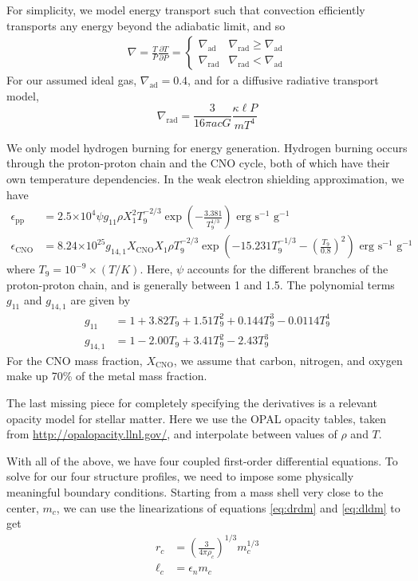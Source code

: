\documentclass[onecolumn]{article}
\newcommand{\E}[1]{\ensuremath{\times 10^{#1}}}
\newcommand{\D}[2]{\ensuremath{\frac{\partial #1}{\partial #2}}}
\begin{document}
For simplicity, we model energy transport such that convection efficiently transports any energy beyond the adiabatic limit, and so
\begin{align} \nabla = \frac{T}{P}\D{T}{P} = 
  \begin{cases}
    \nabla_\text{ad} & \nabla_\text{rad} \ge \nabla_\text{ad} \\
    \nabla_\text{rad} & \nabla_\text{rad} < \nabla_\text{ad}
  \end{cases}
\end{align}
For our assumed ideal gas, $\nabla_\text{ad} = 0.4$, and for a diffusive radiative transport model,
\begin{equation} 
  \nabla_\text{rad} = \frac{3}{16\pi a c G}\frac{\kappa \ell P}{m T^4} 
\end{equation}

We only model hydrogen burning for energy generation.  Hydrogen burning occurs through the proton-proton chain and the CNO cycle, both of which have their own temperature dependencies.  In the weak electron shielding approximation, we have
\begin{align}  
  \epsilon_\text{pp} &= 2.5\E{4} \psi g_\text{11} \rho X_1^2 T_9^{-2/3} \exp\left(-\frac{3.381}{T_9^{1/3}}\right) \text{ erg s}^{-1}\text{ g}^{-1} \\
  \epsilon_\text{CNO} &= 8.24\E{25} g_{14,1} X_\text{CNO} X_1 \rho T_9^{-2/3} \exp\left(-15.231 T_9^{-1/3} - \left(\frac{T_9}{0.8}\right)^2\right) \text{ erg s}^{-1}\text{ g}^{-1} \nonumber
\end{align}
where $T_9 = 10^{-9} \times (T / K)$. Here, $\psi$ accounts for the different branches of the proton-proton chain, and is generally between 1 and 1.5. The polynomial terms $g_{11}$ and $g_{14, 1}$ are given by
\begin{align}
  g_{11} &= 1 + 3.82 T_9 + 1.51 T_9^2 + 0.144 T_9^3 - 0.0114 T_9^4 \\
  g_{14, 1} &= 1 - 2.00 T_9 + 3.41 T_9^2 - 2.43 T_9^3 \nonumber
\end{align}
For the CNO mass fraction, $X_\text{CNO}$, we assume that carbon, nitrogen, and oxygen make up 70\% of the metal mass fraction.

The last missing piece for completely specifying the derivatives is a relevant opacity model for stellar matter.  Here we use the OPAL opacity tables, taken from \url{http://opalopacity.llnl.gov/}, and interpolate between values of $\rho$ and $T$.

With all of the above, we have four coupled first-order differential equations.  To solve for our four structure profiles, we need to impose some physically meaningful boundary conditions.  Starting from a mass shell very close to the center, $m_c$, we can use the linearizations of equations \ref{eq:drdm} and \ref{eq:dldm} to get
\begin{align}
  r_c &= \left(\frac{3}{4\pi \rho_c}\right)^{1/3} m_c^{1/3} \\
  \ell_c &= \epsilon_n m_c \nonumber
\end{align}
\end{document}
